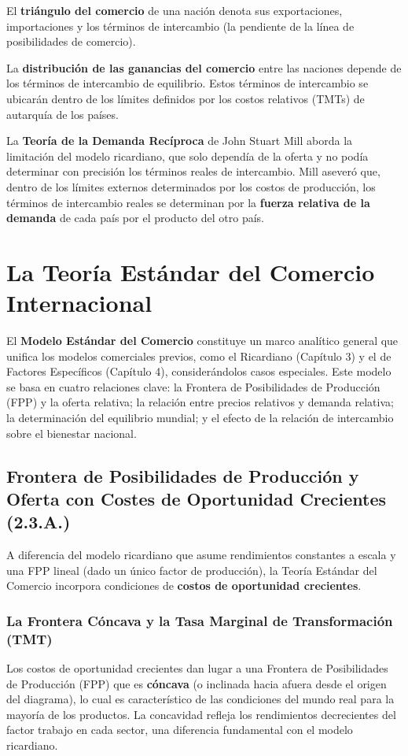 El \textbf{triángulo del comercio} de una nación denota sus exportaciones, importaciones y los términos de intercambio (la pendiente de la línea de posibilidades de comercio).

La \textbf{distribución de las ganancias del comercio} entre las naciones depende de los términos de intercambio de equilibrio. Estos términos de intercambio se ubicarán dentro de los límites definidos por los costos relativos (TMTs) de autarquía de los países.

\begin{propuesta}
La \textbf{Teoría de la Demanda Recíproca} de John Stuart Mill aborda la limitación del modelo ricardiano, que solo dependía de la oferta y no podía determinar con precisión los términos reales de intercambio. Mill aseveró que, dentro de los límites externos determinados por los costos de producción, los términos de intercambio reales se determinan por la \textbf{fuerza relativa de la demanda} de cada país por el producto del otro país.
\end{propuesta}


\section{La Teoría Estándar del Comercio Internacional}
El \textbf{Modelo Estándar del Comercio} constituye un marco analítico general que unifica los modelos comerciales previos, como el Ricardiano (Capítulo 3) y el de Factores Específicos (Capítulo 4), considerándolos casos especiales. Este modelo se basa en cuatro relaciones clave: la Frontera de Posibilidades de Producción (FPP) y la oferta relativa; la relación entre precios relativos y demanda relativa; la determinación del equilibrio mundial; y el efecto de la relación de intercambio sobre el bienestar nacional.

\subsection{Frontera de Posibilidades de Producción y Oferta con Costes de Oportunidad Crecientes (2.3.A.)}

A diferencia del modelo ricardiano que asume rendimientos constantes a escala y una FPP lineal (dado un único factor de producción), la Teoría Estándar del Comercio incorpora condiciones de \textbf{costos de oportunidad crecientes}.

\subsubsection{La Frontera Cóncava y la Tasa Marginal de Transformación (TMT)}
Los costos de oportunidad crecientes dan lugar a una Frontera de Posibilidades de Producción (FPP) que es \textbf{cóncava} (o inclinada hacia afuera desde el origen del diagrama), lo cual es característico de las condiciones del mundo real para la mayoría de los productos. La concavidad refleja los rendimientos decrecientes del factor trabajo en cada sector, una diferencia fundamental con el modelo ricardiano.

